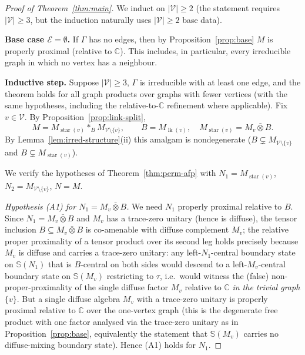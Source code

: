 \documentclass[11pt]{article}
\DeclareMathOperator{\link}{lk}
\DeclareMathOperator{\str}{star}
\newcommand{\Gra}{\Gamma}
\newcommand{\VV}{\mathcal V}
\newcommand{\EE}{\mathcal E}
\newcommand{\abs}[1]{\lvert #1\rvert}
\newcommand{\set}[1]{\{#1\}}
\begin{document}
\begin{proof}[Proof of Theorem~\ref{thm:main}]
We induct on $\abs{\VV}\ge2$ (the statement requires $\abs{\VV}\ge3$, but the induction naturally uses
$\abs{\VV}\ge2$ base data).

\textbf{Base case $\EE=\emptyset$.} If $\Gra$ has no edges, then by Proposition~\ref{prop:base} $M$ is
properly proximal (relative to $\mathbb C$). This includes, in particular, every irreducible graph in which
no vertex has a neighbour.

\textbf{Inductive step.} Suppose $\abs{\VV}\ge3$, $\Gra$ is irreducible with at least one edge, and the
theorem holds for all graph products over graphs with fewer vertices (with the same hypotheses, including the
relative-to-$\mathbb C$ refinement where applicable). Fix $v\in\VV$. By
Proposition~\ref{prop:link-split},
\[
M=M_{\str(v)}*_B M_{\VV\setminus\set v},\qquad B=M_{\link(v)},\quad M_{\str(v)}=M_v\bar\otimes B .
\]
By Lemma~\ref{lem:irred-structure}(ii) this amalgam is nondegenerate
($B\subsetneq M_{\VV\setminus\set v}$ and $B\subsetneq M_{\str(v)}$).

We verify the hypotheses of Theorem~\ref{thm:perm-afp} with $N_1=M_{\str(v)}$, $N_2=M_{\VV\setminus\set v}$,
$N=M$.

\emph{Hypothesis (A1) for $N_1=M_v\bar\otimes B$.} We need $N_1$ properly proximal relative to $B$. Since
$N_1=M_v\bar\otimes B$ and $M_v$ has a trace-zero unitary (hence is diffuse), the tensor inclusion
$B\subseteq M_v\bar\otimes B$ is co-amenable with diffuse complement $M_v$; the relative proper proximality
of a tensor product over its second leg holds precisely because $M_v$ is diffuse and carries a trace-zero
unitary: any left-$N_1$-central boundary state on $\mathbb S(N_1)$ that is $B$-central on both sides would
descend to a left-$M_v$-central boundary state on $\mathbb S(M_v)$ restricting to $\tau$, i.e.\ would witness
the (false) non-proper-proximality of the single diffuse factor $M_v$ relative to $\mathbb C$ \emph{in the
trivial graph $\set v$}. But a single diffuse algebra $M_v$ with a trace-zero unitary is properly proximal
relative to $\mathbb C$ over the one-vertex graph (this is the degenerate free product with one factor
analysed via the trace-zero unitary as in Proposition~\ref{prop:base}, equivalently the statement that
$\mathbb S(M_v)$ carries no diffuse-mixing boundary state). Hence (A1) holds for $N_1$.


\end{proof}
\end{document}
